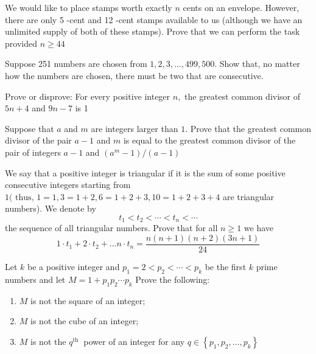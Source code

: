 \documentclass{pset}
\begin{document}
\begin{problems}
    \begin{problem}
    We would like to place stamps worth exactly \(n\) cents on an envelope. However, there are only 5 -cent and 12 -cent stamps available to us (although we have an unlimited supply of both of these stamps). Prove that we can perform the task provided \(n \geq 44\)
    \end{problem}

    \begin{problem}
    Suppose 251 numbers are chosen from \(1,2,3, \ldots, 499,500 .\) Show that, no matter how the numbers are chosen, there must be two that are consecutive.
    \end{problem}

    \begin{problem}
    Prove or disprove: For every positive integer \(n,\) the greatest common divisor of \(5 n+4\) and \(9 n-7\) is 1
    \end{problem}

    \begin{problem}
    Suppose that \(a\) and \(m\) are integers larger than \(1 .\) Prove that the greatest common divisor of the pair \(a-1\) and \(m\) is equal to the greatest common divisor of the pair of integers \(a-1\) and \(\left(a^{m}-1\right) /(a-1)\)
    \end{problem}

    \begin{problem}
    We say that a positive integer is triangular if it is the sum of some positive consecutive integers starting from \(1(\text { thus, } 1=1,3=1+2,6=1+2+3,10=1+2+3+4\) are triangular numbers). We denote by
    $$
        t_{1}<t_{2}<\cdots<t_{n}<\cdots
    $$
    the sequence of all triangular numbers. Prove that for all \(n \geq 1\) we have
    $$
        1 \cdot t_{1}+2 \cdot t_{2}+\ldots n \cdot t_{n}=\frac{n(n+1)(n+2)(3 n+1)}{24}
    $$
    \end{problem}

    \begin{problem}
    Let \(k\) be a positive integer and \(p_{1}=2<p_{2}<\cdots<p_{k}\) be the first \(k\) prime numbers and
    let \(M=1+p_{1} p_{2} \cdots p_{k}\)
    Prove the following:
    \begin{enumerate}
        \item \(M\) is not the square of an integer;
        \item \(M\) is not the cube of an integer;
        \item \(M\) is not the \(q^{\text {th }}\) power of an integer for any \(q \in\left\{p_{1}, p_{2}, \ldots, p_{k}\right\}\)
    \end{enumerate}
    \end{problem}


\end{problems}
\end{document}
